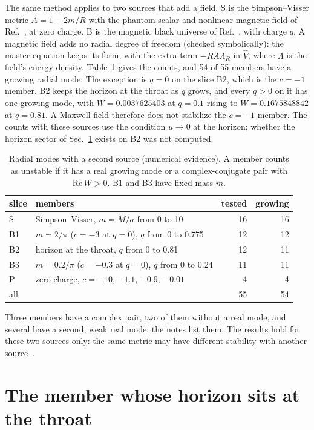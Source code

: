 \documentclass[11pt]{article}
\theoremstyle{plain}
\begin{document}
The same method applies to two sources that add a field. S is the Simpson--Visser metric $A=1-2m/R$ with the phantom scalar
and nonlinear magnetic field of Ref.~\cite{BW22}, at zero charge. B is the magnetic black universe of Ref.~\cite{BBS12}, with
charge $q$. A magnetic field adds no radial degree of freedom (checked symbolically): the master equation keeps its form, with
the extra term $-RA\Lambda_R$ in $\hat V$, where $\Lambda$ is the field's energy density. Table~\ref{tab:sources}
gives the counts, and 54 of 55 members have a growing radial mode. The exception is $q=0$ on the slice B2, which is the $c=-1$
member. B2 keeps the horizon at the throat as $q$ grows, and every $q>0$ on it has one growing mode, with
$W=0.0037625403$ at $q=0.1$ rising to $W=0.1675848842$ at $q=0.81$. A Maxwell field therefore does not stabilize the
$c=-1$ member. The counts with these sources use the condition $u\to0$ at the horizon; whether the horizon sector of
Sec.~\ref{sec:cm1} exists on B2 was not computed.
\nopagebreak
\begin{table}[H]
\centering
\caption{Radial modes with a second source (numerical evidence). A member counts as unstable if it has a real growing mode
or a complex-conjugate pair with $\mathrm{Re}\,W>0$. B1 and B3 have fixed mass $m$.}
\label{tab:sources}
\begin{tabular}{llrr}
\toprule
slice & members & tested & growing \\
\midrule
S & Simpson--Visser, $m=M/a$ from 0 to 10 & 16 & 16 \\
B1 & $m=2/\pi$ ($c=-3$ at $q=0$), $q$ from 0 to 0.775 & 12 & 12 \\
B2 & horizon at the throat, $q$ from 0 to 0.81 & 12 & 11 \\
B3 & $m=0.2/\pi$ ($c=-0.3$ at $q=0$), $q$ from 0 to 0.24 & 11 & 11 \\
P & zero charge, $c=-10$, $-1.1$, $-0.9$, $-0.01$ & 4 & 4 \\
\midrule
all & & 55 & 54 \\
\bottomrule
\end{tabular}
\end{table}

Three members have a complex pair, two of them without a real mode, and several have a second, weak real mode; the notes list
them. The results hold for these two sources only: the same metric may have different stability with another
source~\cite{BW22}.

\section{The member whose horizon sits at the throat}\label{sec:cm1}
\end{document}
